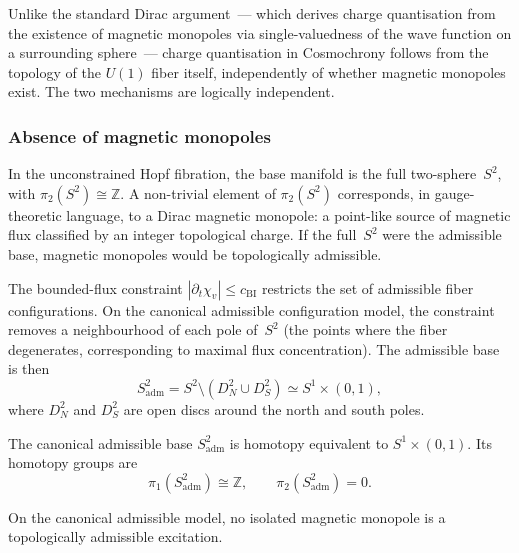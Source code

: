     Unlike the standard Dirac argument~--- which derives charge quantisation from
    the existence of magnetic monopoles via single-valuedness of the wave function
    on a surrounding sphere~--- charge quantisation in Cosmochrony follows from
    the topology of the $U(1)$ fiber itself, independently of whether
    magnetic monopoles exist.
    The two mechanisms are logically independent.

  \subsubsection*{Absence of magnetic monopoles}
    \label{sec:no-monopoles}

    In the unconstrained Hopf fibration, the base manifold is the full two-sphere~$S^2$,
    with $\pi_2(S^2) \cong \mathbb{Z}$.
    A non-trivial element of $\pi_2(S^2)$ corresponds, in gauge-theoretic language,
    to a Dirac magnetic monopole: a point-like source of magnetic flux classified by
    an integer topological charge.
    If the full~$S^2$ were the admissible base, magnetic monopoles would be
    topologically admissible.

    The bounded-flux constraint $|\partial_t \chi_v| \le c_{\mathrm{BI}}$ restricts the
    set of admissible fiber configurations.
    On the canonical admissible configuration model, the constraint removes a
    neighbourhood of each pole of~$S^2$ (the points where the fiber degenerates,
    corresponding to maximal flux concentration).
    The admissible base is then
    \begin{equation}
      S^2_{\mathrm{adm}} = S^2 \setminus (D^2_N \cup D^2_S) \simeq S^1 \times (0,1),
    \end{equation}
    where $D^2_N$ and $D^2_S$ are open discs around the north and south poles.

    \begin{proposition}
      \label{prop:pi2-trivial}
      The canonical admissible base $S^2_{\mathrm{adm}}$ is homotopy equivalent
      to $S^1 \times (0,1)$.
      Its homotopy groups are
      \begin{equation}
        \pi_1(S^2_{\mathrm{adm}}) \cong \mathbb{Z}, \qquad \pi_2(S^2_{\mathrm{adm}}) = 0.
      \end{equation}
    \end{proposition}

    \begin{corollary}
      \label{cor:no-monopoles}
      On the canonical admissible model, no isolated magnetic monopole is a
      topologically admissible excitation.
    \end{corollary}

